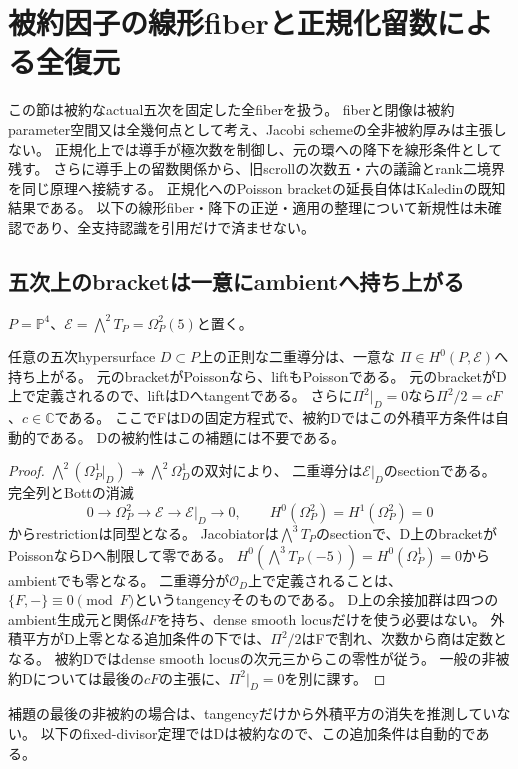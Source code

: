 \section{被約因子の線形fiberと正規化留数による全復元}\label{sec:normalization-residue}
この節は被約なactual五次を固定した全fiberを扱う。
fiberと閉像は被約parameter空間又は全幾何点として考え、Jacobi schemeの全非被約厚みは主張しない。
正規化上では導手が極次数を制御し、元の環への降下を線形条件として残す。
さらに導手上の留数関係から、旧scrollの次数五・六の議論とrank二境界を同じ原理へ接続する。
正規化へのPoisson bracketの延長自体はKaledin\cite[Theorem 1.5, Corollary 1.6]{KaledinNormalization}の既知結果である。
以下の線形fiber・降下の正逆・適用の整理について新規性は未確認であり、全支持認識を引用だけで済ませない。

\subsection{五次上のbracketは一意にambientへ持ち上がる}
$P=\mathbb P^4$、$\mathcal E=\bigwedge^2T_P=\Omega_P^2(5)$と置く。
\begin{lemma}\label{lem:quintic-ambient-lift}
任意の五次hypersurface $D\subset P$上の正則な二重導分は、一意な
$\Pi\in H^0(P,\mathcal E)$へ持ち上がる。
元のbracketがPoissonなら、liftもPoissonである。
元のbracketがD上で定義されるので、liftはDへtangentである。
さらに$\Pi^2|_D=0$なら$\Pi^2/2=cF$、$c\in\mathbb C$である。
ここでFはDの固定方程式で、被約Dではこの外積平方条件は自動的である。
Dの被約性はこの補題には不要である。
\end{lemma}
\begin{proof}
$\bigwedge^2(\Omega_P^1|_D)\twoheadrightarrow\bigwedge^2\Omega_D^1$の双対により、
二重導分は$\mathcal E|_D$のsectionである。
完全列とBottの消滅
\[
 0\longrightarrow\Omega_P^2\longrightarrow\mathcal E
 \longrightarrow\mathcal E|_D\longrightarrow0,\qquad
 H^0(\Omega_P^2)=H^1(\Omega_P^2)=0
\]
からrestrictionは同型となる。
Jacobiatorは$\bigwedge^3T_P$のsectionで、D上のbracketがPoissonならDへ制限して零である。
$H^0(\bigwedge^3T_P(-5))=H^0(\Omega_P^1)=0$からambientでも零となる。
二重導分が$\mathcal O_D$上で定義されることは、$\{F,-\}\equiv0\pmod F$というtangencyそのものである。
D上の余接加群は四つのambient生成元と関係$dF$を持ち、dense smooth locusだけを使う必要はない。
外積平方がD上零となる追加条件の下では、$\Pi^2/2$はFで割れ、次数から商は定数となる。
被約Dではdense smooth locusの次元三からこの零性が従う。
一般の非被約Dについては最後の$cF$の主張に、$\Pi^2|_D=0$を別に課す。
\end{proof}
補題の最後の非被約の場合は、tangencyだけから外積平方の消失を推測していない。
以下のfixed-divisor定理ではDは被約なので、この追加条件は自動的である。

